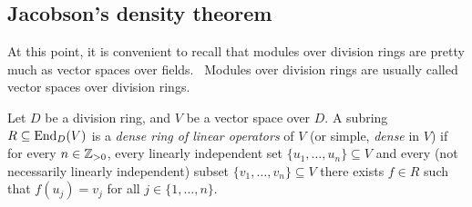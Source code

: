 %
%


\subsection{Jacobson's density theorem}

At this point, it is convenient to recall that
modules over division rings are pretty much as vector spaces over fields. 
Modules over division rings are usually called vector spaces over division rings. 

\begin{definition}
	Let $D$ be a division ring, and $V$ be a vector space over $D$. A subring 
	$R\subseteq\operatorname{End}_D(V)$ is a \emph{dense ring of linear operators} 
	of $V$ (or simple, \emph{dense} in $V$) if for every  
	$n\in\mathbb{Z}_{>0}$, every linearly independent set $\{u_1,\dots,u_n\}\subseteq V$ 
	and every (not necessarily linearly independent) subset $\{v_1,\dots,v_n\}\subseteq V$ 
	there exists $f\in R$ such that $f(u_j)=v_j$ for all 
	$j\in\{1,\dots,n\}$.
\end{definition}

